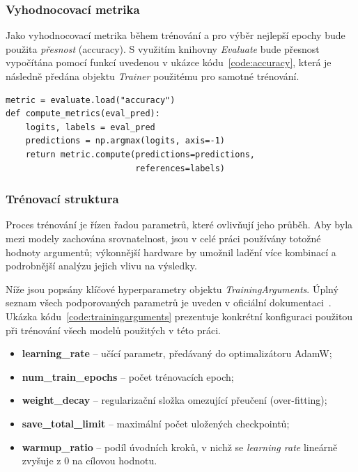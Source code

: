 \subsubsection{Vyhodnocovací metrika}
Jako vyhodnocovací metrika během trénování a pro výběr nejlepší epochy bude použita \emph{přesnost} (accuracy). S využitím knihovny \emph{Evaluate} bude přesnost vypočítána pomocí funkcí uvedenou v ukázce kódu~\ref{code:accuracy}, která je následně předána objektu \emph{Trainer} použitému pro samotné trénování.

\begin{listing}[ht]
\centering
\begin{verbatim}
metric = evaluate.load("accuracy")
def compute_metrics(eval_pred):
    logits, labels = eval_pred
    predictions = np.argmax(logits, axis=-1)
    return metric.compute(predictions=predictions, 
                          references=labels)
\end{verbatim}
\caption[Ukázka funkce pro výpočet přesnosti]%
{Ukázka funkce pro výpočet přesnosti, vlastní práce}
\label{code:accuracy}
\end{listing}

\subsubsection{Trénovací struktura}
Proces trénování je řízen řadou parametrů, které ovlivňují jeho průběh. Aby byla mezi modely zachována srovnatelnost, jsou v celé práci používány totožné hodnoty argumentů; výkonnější hardware by umožnil ladění více kombinací a podrobnější analýzu jejich vlivu na výsledky.

Níže jsou popsány klíčové hyperparametry objektu \emph{TrainingArguments}. Úplný seznam všech podporovaných parametrů je uveden v oficiální dokumentaci~\cite{HuggTrainArg}. Ukázka kódu~\ref{code:trainingarguments} prezentuje konkrétní konfiguraci použitou při trénování všech modelů použitých v této práci.

\begin{itemize}
    \item \textbf{learning\_rate} -- učící parametr, předávaný do optimalizátoru AdamW;
    \item \textbf{num\_train\_epochs} -- počet trénovacích epoch;
    \item \textbf{weight\_decay} -- regularizační složka omezující přeučení (over-fitting);
    \item \textbf{save\_total\_limit} -- maximální počet uložených checkpointů;
    \item \textbf{warmup\_ratio} -- podíl úvodních kroků, v nichž se \emph{learning rate} lineárně zvyšuje z 0 na cílovou hodnotu.
\end{itemize}

